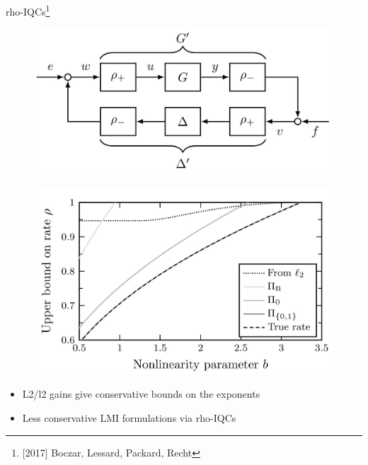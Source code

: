 \documentclass{beamer}
\begin{document}
\begin{frame}{rho-IQCs\footnote{[2017] Boczar, Lessard, Packard, Recht}}
\begin{minipage}{0.45\textwidth}
	\begin{figure}
		\includegraphics[width=1.0\linewidth]{figures/rho_IQCs.JPG}
		\label{fig:mjlstraj}
	\end{figure}
\end{minipage}
\begin{minipage}{0.45\textwidth}
	\begin{figure}
		\includegraphics[width=1.0\linewidth]{figures/Conservatism_exponent.JPG}
		\label{fig:mjlstraj}
	\end{figure}
\end{minipage}
\begin{itemize}
	\item L2/l2 gains give conservative bounds on the exponents 
	\item Less conservative LMI formulations via rho-IQCs
\end{itemize}
\end{frame}
\end{document}
